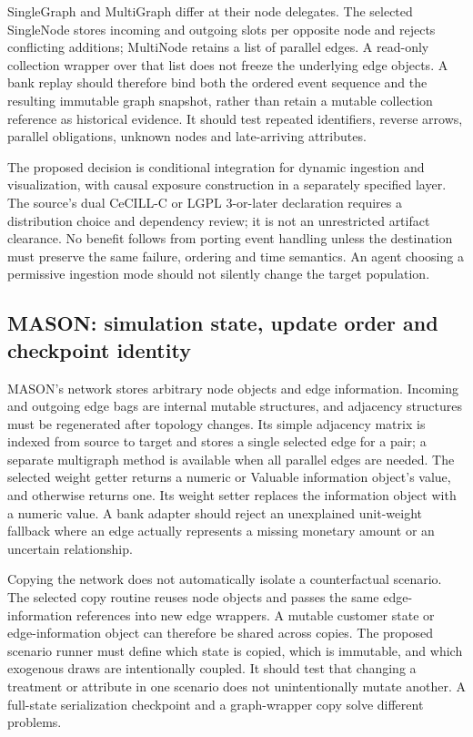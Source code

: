 SingleGraph and MultiGraph differ at their node delegates. The selected SingleNode stores incoming and outgoing slots per opposite node and rejects conflicting additions; MultiNode retains a list of parallel edges. A read-only collection wrapper over that list does not freeze the underlying edge objects. A bank replay should therefore bind both the ordered event sequence and the resulting immutable graph snapshot, rather than retain a mutable collection reference as historical evidence. It should test repeated identifiers, reverse arrows, parallel obligations, unknown nodes and late-arriving attributes.~\citep{exec25_jnet_graphstream}

The proposed decision is conditional integration for dynamic ingestion and visualization, with causal exposure construction in a separately specified layer. The source's dual CeCILL-C or LGPL 3-or-later declaration requires a distribution choice and dependency review; it is not an unrestricted artifact clearance. No benefit follows from porting event handling unless the destination must preserve the same failure, ordering and time semantics. An agent choosing a permissive ingestion mode should not silently change the target population.~\citep{exec25_jnet_graphstream,exec25_jnet_choice}

\subsection{MASON: simulation state, update order and checkpoint identity}

MASON's network stores arbitrary node objects and edge information. Incoming and outgoing edge bags are internal mutable structures, and adjacency structures must be regenerated after topology changes. Its simple adjacency matrix is indexed from source to target and stores a single selected edge for a pair; a separate multigraph method is available when all parallel edges are needed. The selected weight getter returns a numeric or Valuable information object's value, and otherwise returns one. Its weight setter replaces the information object with a numeric value. A bank adapter should reject an unexplained unit-weight fallback where an edge actually represents a missing monetary amount or an uncertain relationship.~\citep{exec25_jnet_mason}

Copying the network does not automatically isolate a counterfactual scenario. The selected copy routine reuses node objects and passes the same edge-information references into new edge wrappers. A mutable customer state or edge-information object can therefore be shared across copies. The proposed scenario runner must define which state is copied, which is immutable, and which exogenous draws are intentionally coupled. It should test that changing a treatment or attribute in one scenario does not unintentionally mutate another. A full-state serialization checkpoint and a graph-wrapper copy solve different problems.~\citep{exec25_jnet_mason}

